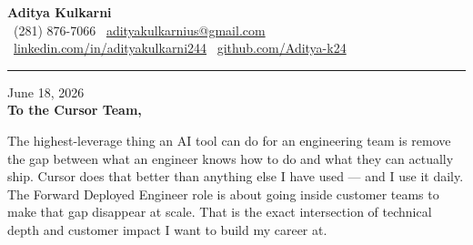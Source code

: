 \documentclass[11pt,letterpaper]{article}
\begin{document}
\begin{center}
    {\Huge \textbf{\color{CursorPurple} Aditya Kulkarni}}\\[8pt]
    {\color{DarkGrey} \small
    \faPhone \ (281) 876-7066 \quad \textbar \quad
    \faEnvelope \ \href{mailto:adityakulkarnius@gmail.com}{adityakulkarnius@gmail.com} \\[4pt]
    \faLinkedin \ \href{https://linkedin.com/in/adityakulkarni244}{linkedin.com/in/adityakulkarni244} \quad \textbar \quad
    \faGithub \ \href{https://github.com/Aditya-k24}{github.com/Aditya-k24}
    }
\end{center}

\vspace{-4pt}
{\color{CursorPurple}\rule{\linewidth}{1.5pt}}
\vspace{10pt}

June 18, 2026\\[10pt]
\textbf{To the Cursor Team,}

\vspace{6pt}

The highest-leverage thing an AI tool can do for an engineering team is remove the gap between what an engineer knows how to do and what they can actually ship. Cursor does that better than anything else I have used --- and I use it daily. The Forward Deployed Engineer role is about going inside customer teams to make that gap disappear at scale. That is the exact intersection of technical depth and customer impact I want to build my career at.

\vspace{4pt}
\end{document}
